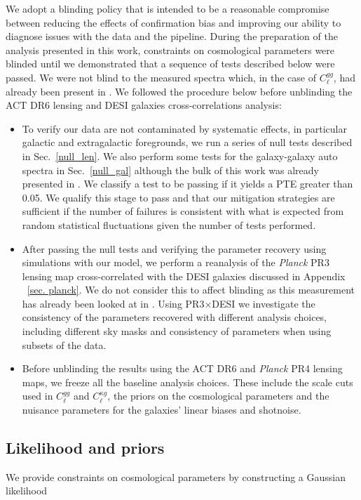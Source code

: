 \documentclass[twocolumn]{aastex631}
\begin{document}
{We adopt a blinding policy that is intended to be a reasonable compromise between reducing the effects of confirmation bias and improving our ability to diagnose issues with the data and the pipeline. During the preparation of the analysis presented in this work, constraints on cosmological parameters were blinded until we demonstrated that a sequence of tests described below were passed. We were not blind to the measured spectra which, in the case of $C^{gg}_\ell$, had already been present in  \citep{hang2021}. We followed the procedure below before unblinding the ACT DR6 lensing and DESI galaxies cross-correlations analysis:
\begin{itemize}
    \item To verify our data are not contaminated by systematic effects, in particular galactic and extragalactic foregrounds, we run a series of null tests described in Sec.~\ref{null_len}. We also perform some tests for the galaxy-galaxy auto spectra in Sec.~\ref{null_gal} although the bulk of this work was already presented in \cite{hang2021}. We classify a test to be passing if it yields a PTE greater than 0.05. We qualify this stage to pass and that our mitigation strategies are sufficient if the number of failures is consistent with what is expected from random statistical fluctuations given the number of tests performed. 
    \item After passing the null tests and verifying the parameter recovery using simulations with our model, we perform a reanalysis of the \textit{Planck} PR3 lensing map cross-correlated with the DESI galaxies discussed in Appendix ~\ref{sec. planck}. We do not consider this to affect blinding as this measurement has already been looked at in \citep{hang2021}. Using PR3$\times$DESI we investigate the consistency of the parameters recovered with different analysis choices, including different sky masks and consistency of parameters when using subsets of the data.
    \item Before unblinding the results using the ACT DR6 and \textit{Planck} PR4 lensing maps, we freeze all the baseline analysis choices. These include the scale cuts used in $C^{gg}_\ell$ and $C^{\kappa{g}}_\ell$, the priors on the cosmological parameters and the nuisance parameters for the galaxies' linear biases and shotnoise.
\end{itemize}

\subsection{Likelihood and priors} \label{sec: likelihood_prior}
We provide constraints on cosmological parameters by constructing a Gaussian likelihood

}
\end{document}

